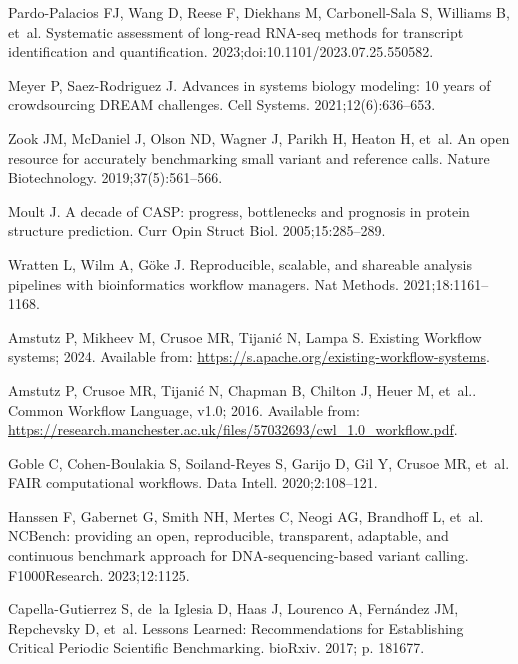 \documentclass[11pt]{article}
\begin{document}
\begin{thebibliography}{10}
Pardo-Palacios FJ, Wang D, Reese F, Diekhans M, Carbonell-Sala S, Williams B,
  et~al.
\newblock Systematic assessment of long-read RNA-seq methods for transcript
  identification and quantification. 2023;doi:{10.1101/2023.07.25.550582}.

Meyer P, Saez-Rodriguez J.
\newblock Advances in systems biology modeling: 10 years of crowdsourcing DREAM
  challenges.
\newblock Cell Systems. 2021;12(6):636--653.

Zook JM, McDaniel J, Olson ND, Wagner J, Parikh H, Heaton H, et~al.
\newblock An open resource for accurately benchmarking small variant and
  reference calls.
\newblock Nature Biotechnology. 2019;37(5):561--566.

Moult J.
\newblock A decade of {CASP}: progress, bottlenecks and prognosis in protein
  structure prediction.
\newblock Curr Opin Struct Biol. 2005;15:285--289.

Wratten L, Wilm A, Göke J.
\newblock Reproducible, scalable, and shareable analysis pipelines with
  bioinformatics workflow managers.
\newblock Nat Methods. 2021;18:1161--1168.

Amstutz P, Mikheev M, Crusoe MR, Tijanić N, Lampa S. Existing Workflow
  systems; 2024.
\newblock Available from: \url{https://s.apache.org/existing-workflow-systems}.

Amstutz P, Crusoe MR, Tijanić N, Chapman B, Chilton J, Heuer M, et~al.. Common
  Workflow Language, {v1}.0; 2016.
\newblock Available from:
  \url{https://research.manchester.ac.uk/files/57032693/cwl_1.0_workflow.pdf}.

Goble C, Cohen-Boulakia S, Soiland-Reyes S, Garijo D, Gil Y, Crusoe MR, et~al.
\newblock FAIR computational workflows.
\newblock Data Intell. 2020;2:108--121.

Hanssen F, Gabernet G, Smith NH, Mertes C, Neogi AG, Brandhoff L, et~al.
\newblock NCBench: providing an open, reproducible, transparent, adaptable, and
  continuous benchmark approach for {DNA}-sequencing-based variant calling.
\newblock F1000Research. 2023;12:1125.

Capella-Gutierrez S, de~la Iglesia D, Haas J, Lourenco A, Fernández JM,
  Repchevsky D, et~al.
\newblock Lessons Learned: Recommendations for Establishing Critical Periodic
  Scientific Benchmarking.
\newblock bioRxiv. 2017; p. 181677.


\end{thebibliography}
\end{document}
